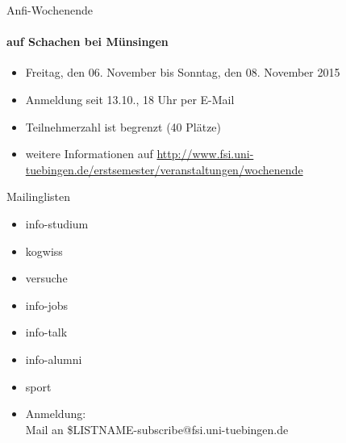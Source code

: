 \documentclass{beamer}
\begin{document}
	\begin{frame}{Anfi-Wochenende}
		\framesubtitle{auf Schachen bei Münsingen}
		\begin{itemize}
			\item Freitag, den 06. November bis Sonntag, den 08. November 2015
			\item Anmeldung seit 13.10., 18 Uhr per E-Mail
			\item Teilnehmerzahl ist begrenzt (40 Plätze)
			\item weitere Informationen auf \url{http://www.fsi.uni-tuebingen.de/erstsemester/veranstaltungen/wochenende}
		\end{itemize}
	\end{frame}

	\begin{frame}[<+->]{Mailinglisten}
		\begin{itemize}
			\item info-studium
			\item kogwiss
			\item versuche
			\item info-jobs
			\item info-talk
			\item info-alumni
            \item sport
			\item Anmeldung:\\
				Mail an \$LISTNAME-subscribe@fsi.uni-tuebingen.de
		\end{itemize}
	\end{frame}
\end{document}
